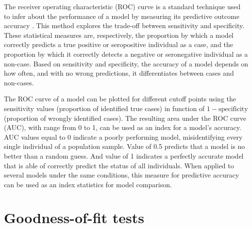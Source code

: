 The receiver operating characteristic (ROC) curve is a standard technique used to infer about the performance of a model by measuring its predictive outcome accuracy \cite{hosmer2013applied}.
This method explores the trade-off between sensitivity and specificity.
These statistical measures are, respectively, the proportion by which a model correctly predicts a true positive or seropositive individual as a case, and the proportion by which it correctly detects a negative or seronegative individual as a non-case.
Based on sensitivity and specificity, the accuracy of a model depends on how often, and with no wrong predictions, it differentiates between cases and non-cases.

The ROC curve of a model can be plotted for different cutoff points using the sensitivity values (proportion of identified true cases) in function of $1-\text{specificity}$ (proportion of wrongly identified cases).
The resulting area under the ROC curve (AUC), with range from 0 to 1, can be used as an index for a model's accuracy.
AUC values equal to 0 indicate a poorly performing model, misidentifying every single individual of a population sample.
Value of 0.5 predicts that a model is no better than a random guess.
And value of 1 indicates a perfectly accurate model that is able of correctly predict the status of all individuals.
When applied to several models under the same conditions, this measure for predictive accuracy can be used as an index statistics for model comparison.



\section{Goodness-of-fit tests}

